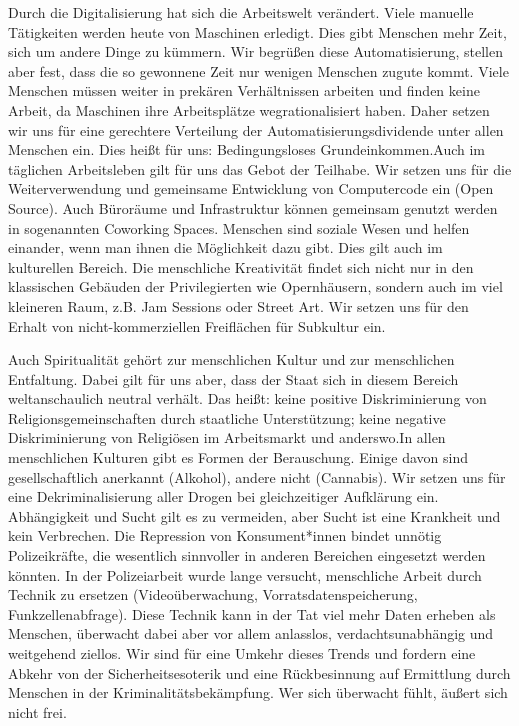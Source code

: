 \documentclass[a4paper,10pt]{article}
\begin{document}
\enlargethispage{1em}
Durch die Digitalisierung hat sich die Arbeitswelt verändert. Viele
manuelle Tätigkeiten werden heute von Maschinen erledigt. Dies gibt
Menschen mehr Zeit, sich um andere Dinge zu kümmern. Wir begrüßen diese
Automatisierung, stellen aber fest, dass die so gewonnene Zeit nur
wenigen Menschen zugute kommt. Viele Menschen müssen weiter in prekären
Verhältnissen arbeiten und finden keine Arbeit, da Maschinen ihre
Arbeitsplätze wegrationalisiert haben. Daher setzen wir uns für eine
gerechtere Verteilung der Automatisierungsdividende unter allen Menschen
ein. Dies heißt für uns: Bedingungsloses Grundeinkommen.Auch im
täglichen Arbeitsleben gilt für uns das Gebot der Teilhabe. Wir setzen
uns für die Weiterverwendung und gemeinsame Entwicklung von Computercode
ein (Open Source). Auch Büroräume und Infrastruktur können gemeinsam
genutzt werden in sogenannten Coworking Spaces. Menschen sind soziale
Wesen und helfen einander, wenn man ihnen die Möglichkeit dazu gibt.
Dies gilt auch im kulturellen Bereich. Die menschliche Kreativität
findet sich nicht nur in den klassischen Gebäuden der Privilegierten wie
Opernhäusern, sondern auch im viel kleineren Raum, z.B. Jam Sessions
oder Street Art. Wir setzen uns für den Erhalt von nicht-kommerziellen
Freiflächen für Subkultur ein.

\enlargethispage{-3em}
Auch Spiritualität gehört zur menschlichen Kultur und zur menschlichen
Entfaltung. Dabei gilt für uns aber, dass der Staat sich in diesem
Bereich weltanschaulich neutral verhält. Das heißt: keine positive
Diskriminierung von Religionsgemeinschaften durch staatliche
Unterstützung; keine negative Diskriminierung von Religiösen im
Arbeitsmarkt und anderswo.In allen menschlichen Kulturen gibt es Formen
der Berauschung. Einige davon sind gesellschaftlich anerkannt (Alkohol),
andere nicht (Cannabis). Wir setzen uns für eine Dekriminalisierung
aller Drogen bei gleichzeitiger Aufklärung ein. Abhängigkeit und Sucht
gilt es zu vermeiden, aber Sucht ist eine Krankheit und kein Verbrechen.
Die Repression von Konsument*innen bindet unnötig Polizeikräfte, die
wesentlich sinnvoller in anderen Bereichen eingesetzt werden könnten. In
der Polizeiarbeit wurde lange versucht, menschliche Arbeit durch Technik
zu ersetzen (Videoüberwachung, Vorratsdatenspeicherung,
Funkzellenabfrage). Diese Technik kann in der Tat viel mehr Daten
erheben als Menschen, überwacht dabei aber vor allem anlasslos,
verdachtsunabhängig und weitgehend ziellos. Wir sind für eine Umkehr
dieses Trends und fordern eine Abkehr von der Sicherheitsesoterik und
eine Rückbesinnung auf Ermittlung durch Menschen in der
Kriminalitätsbekämpfung. Wer sich überwacht fühlt, äußert sich nicht
frei.
\end{document}
